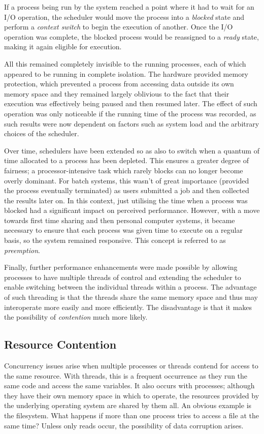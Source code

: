 If a process being run by the system reached a point where it had to
wait for an I/O operation, the scheduler would move the process into a
\emph{blocked} state and perform a \emph{context switch} to begin the
execution of another.  Once the I/O operation was complete, the
blocked process would be reassigned to a \emph{ready} state, making it
again eligible for execution.

All this remained completely invisible to the running processes, each
of which appeared to be running in complete isolation.  The hardware
provided memory protection, which prevented a process from accessing
data outside its own memory space and they remained largely oblivious
to the fact that their execution was effectively being paused and then
resumed later.  The effect of such operation was only noticeable if
the running time of the process was recorded, as such results were now
dependent on factors such as system load and the arbitrary choices of
the scheduler.

Over time, schedulers have been extended so as also to switch when a
quantum of time allocated to a process has been depleted.  This
ensures a greater degree of fairness; a processor-intensive task which
rarely blocks can no longer become overly dominant.  For batch
systems, this wasn't of great importance (provided the process
eventually terminated) as users submitted a job and then collected the
results later on.  In this context, just utilising the time when a
process was blocked had a significant impact on perceived performance.
However, with a move towards first time sharing and then personal
computer systems, it became necessary to ensure that each process was
given time to execute on a regular basis, so the system remained
responsive.  This concept is referred to as \emph{preemption}.

Finally, further performance enhancements were made possible by
allowing processes to have multiple threads of control and extending
the scheduler to enable switching between the individual threads
within a process.  The advantage of such threading is that the threads
share the same memory space and thus may interoperate more easily and
more efficiently.  The disadvantage is that it makes the possibility
of \emph{contention} much more likely.

\subsection{Resource Contention}

Concurrency issues arise when multiple processes or threads contend
for access to the same resource.  With threads, this is a frequent
occurrence as they run the same code and access the same variables.
It also occurs with processes; although they have their own memory
space in which to operate, the resources provided by the underlying
operating system are shared by them all.  An obvious example is the
filesystem.  What happens if more than one process tries to access a
file at the same time?  Unless only reads occur, the possibility of
data corruption arises.


